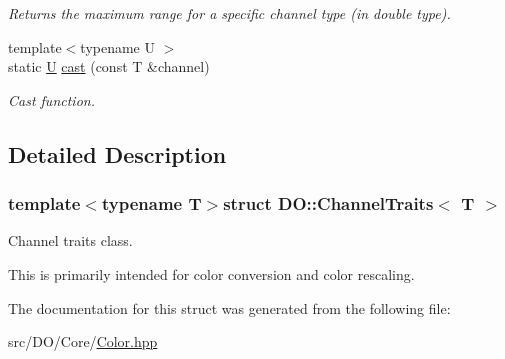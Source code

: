 \begin{DoxyCompactItemize}
\begin{DoxyCompactList}\small\item\em Returns the maximum range for a specific channel type (in double type). \end{DoxyCompactList}\item 
\hypertarget{struct_d_o_1_1_channel_traits_ad0d4458b14e8213cd30ca819fe69d7ed}{{\footnotesize template$<$typename U $>$ }\\static \hyperlink{struct_d_o_1_1_u}{U} \hyperlink{struct_d_o_1_1_channel_traits_ad0d4458b14e8213cd30ca819fe69d7ed}{cast} (const T \&channel)}\label{struct_d_o_1_1_channel_traits_ad0d4458b14e8213cd30ca819fe69d7ed}

\begin{DoxyCompactList}\small\item\em Cast function. \end{DoxyCompactList}\end{DoxyCompactItemize}


\subsection{Detailed Description}
\subsubsection*{template$<$typename T$>$struct D\-O\-::\-Channel\-Traits$<$ T $>$}

Channel traits class. 

This is primarily intended for color conversion and color rescaling. 

The documentation for this struct was generated from the following file\-:\begin{DoxyCompactItemize}
\item 
src/\-D\-O/\-Core/\hyperlink{_color_8hpp}{Color.\-hpp}\end{DoxyCompactItemize}
